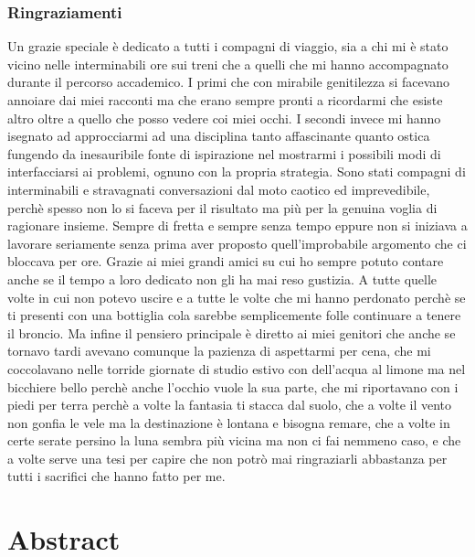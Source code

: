 \documentclass[12pt,a4paper]{book}
\begin{document}
	
	\tableofcontents  %
	
	\subsection*{Ringraziamenti}
	  Un grazie speciale è dedicato a tutti i compagni di viaggio, sia a chi mi è stato vicino nelle interminabili ore sui treni che a quelli che mi hanno accompagnato durante il percorso accademico. I primi che con mirabile genitilezza si facevano annoiare dai miei racconti ma che erano sempre pronti a ricordarmi che esiste altro oltre a quello che posso vedere coi miei occhi. I secondi invece mi hanno isegnato ad approcciarmi ad una disciplina tanto affascinante quanto ostica fungendo da inesauribile fonte di ispirazione nel mostrarmi i possibili modi di interfacciarsi ai problemi, ognuno con la propria strategia. Sono stati compagni di interminabili e stravagnati conversazioni dal moto caotico ed imprevedibile, perchè spesso non lo si faceva per il risultato ma più per la genuina voglia di ragionare insieme. Sempre di fretta e sempre senza tempo eppure non si iniziava a lavorare seriamente senza prima aver proposto quell'improbabile argomento che ci bloccava per ore. Grazie ai miei grandi amici su cui ho sempre potuto contare anche se il tempo a loro dedicato non gli ha mai reso gustizia. A tutte quelle volte in cui non potevo uscire e a tutte le volte che mi hanno perdonato perchè se ti presenti con una bottiglia cola sarebbe semplicemente folle continuare a tenere il broncio. Ma infine il pensiero principale è diretto ai miei genitori che anche se tornavo tardi avevano comunque la pazienza di aspettarmi per cena, che mi coccolavano nelle torride giornate di studio estivo con dell'acqua al limone ma nel bicchiere bello perchè anche l'occhio vuole la sua parte, che mi riportavano con i piedi per terra perchè a volte la fantasia ti stacca dal suolo, che a volte il vento non gonfia le vele ma la destinazione è lontana e bisogna remare, che a volte in certe serate persino la luna sembra più vicina ma non ci fai nemmeno caso, e che a volte serve una tesi per capire che non potrò mai ringraziarli abbastanza per tutti i sacrifici che hanno fatto per me.
	
	\chapter{Abstract}
	
\end{document}
